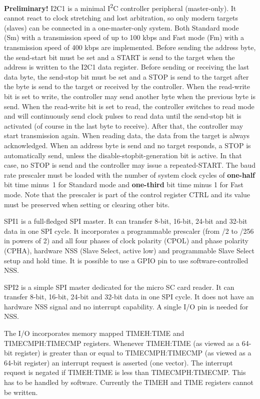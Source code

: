 \documentclass[12pt]{article}
\begin{document}
\textbf{Preliminary!}
I2C1 is a minimal I\textsuperscript{2}C controller peripheral (master-only). It cannot react to clock stretching and lost arbitration, so only modern targets (slaves) can be connected in a one-master-only system. Both Standard mode (Sm) with a transmission speed of up to 100 kbps and Fast mode (Fm) with a transmission speed of 400 kbps are implemented. Before sending the address byte, the send-start bit must be set and a START is send to the target when the address is written to the I2C1 data register. Before sending or receiving the last data byte, the send-stop bit must be set and a STOP is send to the target after the byte is send to the target or received by the controller. When the read-write bit is set to write, the controller may send another byte when the previous byte is send. When the read-write bit is set to read, the controller switches to read mode and will continuously send clock pulses to read data until the send-stop bit is activated (of course in the last byte to receive). After that, the controller may start transmission again. When reading data, the data from the target is always acknowledged. When an address byte is send and no target responds, a STOP is automatically send, unless the disable-stopbit-generation bit is active. In that case, no STOP is send and the controller may issue a repeated-START. The baud rate prescaler must be loaded with the number of system clock cycles of \textbf{one-half} bit time minus~1 for Standard mode and \textbf{one-third} bit time minus 1 for Fast mode. Note that the prescaler is part of the control register CTRL and its value must be preserved when setting or clearing other bits.

SPI1 is a full-fledged SPI master. It can transfer 8-bit, 16-bit, 24-bit and 32-bit data in one SPI cycle. It incorporates a programmable prescaler (from /2 to /256 in powers of 2) and all four phases of clock polarity (CPOL) and phase polarity (CPHA), hardware NSS (Slave Select, active low) and programmable Slave Select setup and hold time. It is possible to use a GPIO pin to use software-controlled NSS.

SPI2 is a simple SPI master dedicated for the micro SC card reader. It can transfer 8-bit, 16-bit, 24-bit and 32-bit data in one SPI cycle. It does not have an hardware NSS signal and no interrupt capability. A single I/O pin is needed for NSS.

The I/O incorporates memory mapped TIMEH:TIME and TIMECMPH:TIMECMP registers. Whenever TIMEH:TIME (as viewed as a 64-bit register) is greater than or equal to TIMECMPH:TIMECMP (as viewed as a 64-bit register) an interrupt request is asserted (one vector). The interrupt request is negated if TIMEH:TIME is less than TIMECMPH:TIMECMP. This has to be handled by software. Currently the TIMEH and TIME registers cannot be written.
\end{document}
